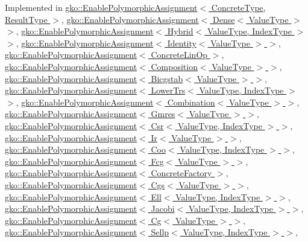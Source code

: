 Implemented in \hyperlink{classgko_1_1EnablePolymorphicAssignment_a0a4cf244139e7761d6a91c61e029810e}{gko\+::\+Enable\+Polymorphic\+Assignment$<$ Concrete\+Type, Result\+Type $>$}, \hyperlink{classgko_1_1EnablePolymorphicAssignment_a0a4cf244139e7761d6a91c61e029810e}{gko\+::\+Enable\+Polymorphic\+Assignment$<$ Dense$<$ Value\+Type $>$ $>$}, \hyperlink{classgko_1_1EnablePolymorphicAssignment_a0a4cf244139e7761d6a91c61e029810e}{gko\+::\+Enable\+Polymorphic\+Assignment$<$ Hybrid$<$ Value\+Type, Index\+Type $>$ $>$}, \hyperlink{classgko_1_1EnablePolymorphicAssignment_a0a4cf244139e7761d6a91c61e029810e}{gko\+::\+Enable\+Polymorphic\+Assignment$<$ Identity$<$ Value\+Type $>$ $>$}, \hyperlink{classgko_1_1EnablePolymorphicAssignment_a0a4cf244139e7761d6a91c61e029810e}{gko\+::\+Enable\+Polymorphic\+Assignment$<$ Concrete\+Lin\+Op $>$}, \hyperlink{classgko_1_1EnablePolymorphicAssignment_a0a4cf244139e7761d6a91c61e029810e}{gko\+::\+Enable\+Polymorphic\+Assignment$<$ Composition$<$ Value\+Type $>$ $>$}, \hyperlink{classgko_1_1EnablePolymorphicAssignment_a0a4cf244139e7761d6a91c61e029810e}{gko\+::\+Enable\+Polymorphic\+Assignment$<$ Bicgstab$<$ Value\+Type $>$ $>$}, \hyperlink{classgko_1_1EnablePolymorphicAssignment_a0a4cf244139e7761d6a91c61e029810e}{gko\+::\+Enable\+Polymorphic\+Assignment$<$ Lower\+Trs$<$ Value\+Type, Index\+Type $>$ $>$}, \hyperlink{classgko_1_1EnablePolymorphicAssignment_a0a4cf244139e7761d6a91c61e029810e}{gko\+::\+Enable\+Polymorphic\+Assignment$<$ Combination$<$ Value\+Type $>$ $>$}, \hyperlink{classgko_1_1EnablePolymorphicAssignment_a0a4cf244139e7761d6a91c61e029810e}{gko\+::\+Enable\+Polymorphic\+Assignment$<$ Gmres$<$ Value\+Type $>$ $>$}, \hyperlink{classgko_1_1EnablePolymorphicAssignment_a0a4cf244139e7761d6a91c61e029810e}{gko\+::\+Enable\+Polymorphic\+Assignment$<$ Csr$<$ Value\+Type, Index\+Type $>$ $>$}, \hyperlink{classgko_1_1EnablePolymorphicAssignment_a0a4cf244139e7761d6a91c61e029810e}{gko\+::\+Enable\+Polymorphic\+Assignment$<$ Ir$<$ Value\+Type $>$ $>$}, \hyperlink{classgko_1_1EnablePolymorphicAssignment_a0a4cf244139e7761d6a91c61e029810e}{gko\+::\+Enable\+Polymorphic\+Assignment$<$ Coo$<$ Value\+Type, Index\+Type $>$ $>$}, \hyperlink{classgko_1_1EnablePolymorphicAssignment_a0a4cf244139e7761d6a91c61e029810e}{gko\+::\+Enable\+Polymorphic\+Assignment$<$ Fcg$<$ Value\+Type $>$ $>$}, \hyperlink{classgko_1_1EnablePolymorphicAssignment_a0a4cf244139e7761d6a91c61e029810e}{gko\+::\+Enable\+Polymorphic\+Assignment$<$ Concrete\+Factory $>$}, \hyperlink{classgko_1_1EnablePolymorphicAssignment_a0a4cf244139e7761d6a91c61e029810e}{gko\+::\+Enable\+Polymorphic\+Assignment$<$ Cgs$<$ Value\+Type $>$ $>$}, \hyperlink{classgko_1_1EnablePolymorphicAssignment_a0a4cf244139e7761d6a91c61e029810e}{gko\+::\+Enable\+Polymorphic\+Assignment$<$ Ell$<$ Value\+Type, Index\+Type $>$ $>$}, \hyperlink{classgko_1_1EnablePolymorphicAssignment_a0a4cf244139e7761d6a91c61e029810e}{gko\+::\+Enable\+Polymorphic\+Assignment$<$ Jacobi$<$ Value\+Type, Index\+Type $>$ $>$}, \hyperlink{classgko_1_1EnablePolymorphicAssignment_a0a4cf244139e7761d6a91c61e029810e}{gko\+::\+Enable\+Polymorphic\+Assignment$<$ Cg$<$ Value\+Type $>$ $>$}, \hyperlink{classgko_1_1EnablePolymorphicAssignment_a0a4cf244139e7761d6a91c61e029810e}{gko\+::\+Enable\+Polymorphic\+Assignment$<$ Sellp$<$ Value\+Type, Index\+Type $>$ $>$}, 